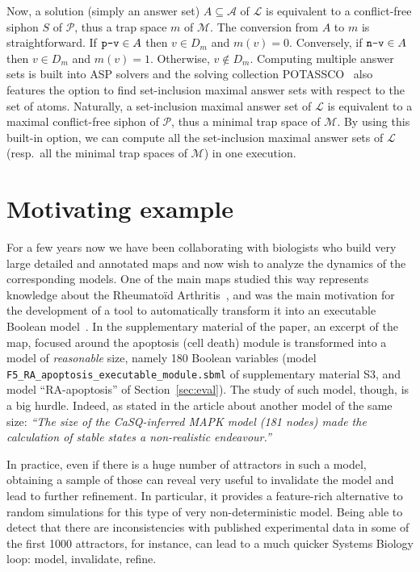\documentclass[runningheads]{llncs}
\begin{document}
Now, a solution (simply an answer set) \(A \subseteq \mathcal{A}\) of \(\mathcal{L}\) is equivalent to a conflict-free siphon \(S\) of \(\mathcal{P}\), thus a trap space \(m\) of \(\mathcal{M}\). The conversion from \(A\) to \(m\) is straightforward. If \(\verb|p-v| \in A\) then \(v \in D_m\) and \(m(v) = 0\). Conversely, if \(\verb|n-v| \in A\) then \(v \in D_m\) and \(m(v) = 1\). Otherwise, \(v \not \in D_m\). Computing multiple answer sets is built into ASP solvers and the solving collection POTASSCO~\cite{DBLP:journals/aicom/GebserKKOSS11} also features the option to find set-inclusion maximal answer sets with respect to the set of atoms. Naturally, a set-inclusion maximal answer set of \(\mathcal{L}\) is equivalent to a maximal conflict-free siphon of \(\mathcal{P}\), thus a minimal trap space of \(\mathcal{M}\). By using this built-in option, we can compute all the set-inclusion maximal answer sets of \(\mathcal{L}\) (resp.\ all the minimal trap spaces of \(\mathcal{M}\)) in one execution.

\section{Motivating example}

For a few years now we have been collaborating with biologists who build very large detailed and annotated maps and now wish to analyze the dynamics of the corresponding models.
One of the main maps studied this way represents knowledge about the Rheumatoïd Arthritis~\cite{singh2018computational}, and was the main motivation for the development of a tool to automatically transform it into an executable Boolean model~\cite{aghamiri2020automated}.
In the supplementary material of the paper, an excerpt of the map, focused around the apoptosis (cell death) module is transformed into a model of \emph{reasonable} size, namely 180 Boolean variables (model \verb|F5_RA_apoptosis_executable_module.sbml| of supplementary material S3, and model ``RA-apoptosis'' of Section~\ref{sec:eval}).
The study of such model, though, is a big hurdle.
Indeed, as stated in the article about another model of the same size:
\emph{``The size of the CaSQ-inferred MAPK model (181 nodes) made the calculation of stable states a non-realistic endeavour.''}

In practice, even if there is a huge number of attractors in such a model, obtaining a sample of those can reveal very useful to invalidate the model and lead to further refinement.
In particular, it provides a feature-rich alternative to random simulations for this type of very non-deterministic model.
Being able to detect that there are inconsistencies with published experimental data in some of the first 1000 attractors, for instance, can lead to a much quicker Systems Biology loop: model, invalidate, refine.
\end{document}
